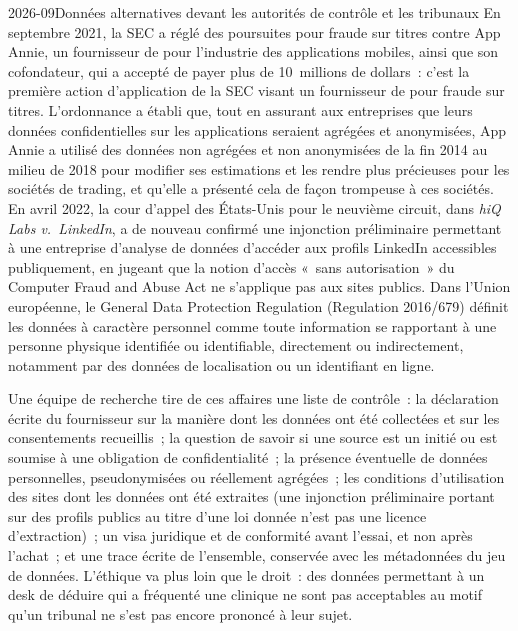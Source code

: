 \begin{dated}{2026-09}{Données alternatives devant les autorités de contrôle et les tribunaux}\label{dat:rs:alternative-and-text-data:law}
En septembre 2021, la SEC a réglé des poursuites pour fraude sur titres contre App Annie, un fournisseur de  pour l'industrie des applications mobiles, ainsi que
son cofondateur, qui a accepté de payer plus de 10~millions de dollars~: c'est la première action d'application de la SEC visant un fournisseur de 
pour fraude sur titres. L'ordonnance a établi que, tout en assurant aux entreprises que leurs données confidentielles sur les applications seraient agrégées et anonymisées, App Annie a utilisé
des données non agrégées et non anonymisées de la fin 2014 au milieu de 2018 pour modifier ses estimations et les rendre plus précieuses pour les sociétés de trading, et
qu'elle a présenté cela de façon trompeuse à ces sociétés. En avril 2022, la cour d'appel des États-Unis pour le neuvième circuit, dans \emph{hiQ Labs v.\ LinkedIn}, a de nouveau
confirmé une injonction préliminaire permettant à une entreprise d'analyse de données d'accéder aux profils LinkedIn accessibles publiquement, en jugeant que la notion
d'accès «~sans autorisation~» du Computer Fraud and Abuse Act ne s'applique pas aux sites publics. Dans l'Union européenne, le General Data
Protection Regulation (Regulation 2016/679) définit les données à caractère personnel comme toute information se rapportant à une personne physique
identifiée ou identifiable, directement ou indirectement, notamment par des données de localisation ou un identifiant en ligne.
\end{dated}

Une équipe de recherche tire de ces affaires une liste de contrôle~: la déclaration écrite du fournisseur sur la manière dont les données ont été collectées et sur les
consentements recueillis~; la question de savoir si une source est un initié ou est soumise à une obligation de confidentialité~; la présence éventuelle de données personnelles, pseudonymisées ou réellement agrégées~;
les conditions d'utilisation des sites dont les données ont été extraites (une injonction préliminaire portant sur des profils publics au titre d'une loi donnée n'est pas une licence d'extraction)~; un visa juridique et
de conformité avant l'essai, et non après l'achat~; et une trace écrite de l'ensemble, conservée avec les métadonnées du jeu de données. L'éthique va plus loin
que le droit~: des données permettant à un desk de déduire qui a fréquenté une clinique ne sont pas acceptables au motif qu'un tribunal ne s'est pas encore prononcé à leur sujet.

